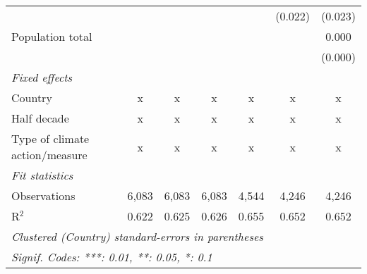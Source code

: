 \begin{tabular}{lcccccc}
                                                                             &         &                &                &                & (0.022)        & (0.023)\\   
   Population total                                                          &         &                &                &                &                & 0.000\\   
                                                                             &         &                &                &                &                & (0.000)\\   
   \emph{Fixed effects}\\
   Country                                                                   & x       & x              & x              & x              & x              & x\\  
   Half decade                                                               & x       & x              & x              & x              & x              & x\\  
   Type of climate action/measure                                            & x       & x              & x              & x              & x              & x\\  
   \midrule \emph{Fit statistics}\\
   Observations                                                              & 6,083   & 6,083          & 6,083          & 4,544          & 4,246          & 4,246\\  
   R$^2$                                                                     & 0.622   & 0.625          & 0.626          & 0.655          & 0.652          & 0.652\\  
   \midrule
   \multicolumn{7}{l}{\emph{Clustered (Country) standard-errors in parentheses}}\\
   \multicolumn{7}{l}{\emph{Signif. Codes: ***: 0.01, **: 0.05, *: 0.1}}\\
\end{tabular}
\par\endgroup



